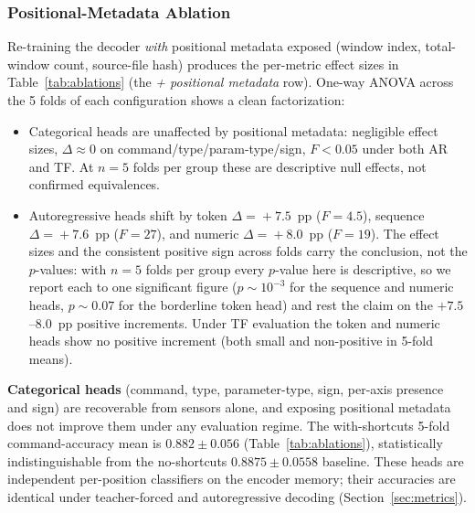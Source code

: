 \documentclass[sensors,article,submit,moreauthors,pdftex]{Definitions/mdpi}
\begin{document}
\subsubsection{Positional-Metadata Ablation}
\label{sec:abl-positional}
Re-training the decoder \emph{with} positional metadata exposed (window index, total-window count, source-file hash) produces the per-metric effect sizes in Table~\ref{tab:ablations} (the \emph{+ positional metadata} row). One-way ANOVA across the 5 folds of each configuration shows a clean factorization:

\begin{itemize}
\item Categorical heads are unaffected by positional metadata: negligible effect sizes, $\Delta\!\approx\!0$ on command/type/param-type/sign, $F<0.05$ under both AR and TF. At $n\!=\!5$ folds per group these are descriptive null effects, not confirmed equivalences.
\item Autoregressive heads shift by token $\Delta\!=\!+7.5$~pp ($F\!=\!4.5$), sequence $\Delta\!=\!+7.6$~pp ($F\!=\!27$), and numeric $\Delta\!=\!+8.0$~pp ($F\!=\!19$). The effect sizes and the consistent positive sign across folds carry the conclusion, not the $p$-values: with $n\!=\!5$ folds per group every $p$-value here is descriptive, so we report each to one significant figure ($p\!\sim\!10^{-3}$ for the sequence and numeric heads, $p\!\sim\!0.07$ for the borderline token head) and rest the claim on the $+7.5$--$8.0$~pp positive increments. Under TF evaluation the token and numeric heads show no positive increment (both small and non-positive in 5-fold means).
\end{itemize}

\textbf{Categorical heads} (command, type, parameter-type, sign, per-axis presence and sign) are recoverable from sensors alone, and exposing positional metadata does not improve them under any evaluation regime. The with-shortcuts 5-fold command-accuracy mean is $0.882 \pm 0.056$ (Table~\ref{tab:ablations}), statistically indistinguishable from the no-shortcuts $0.8875 \pm 0.0558$ baseline. These heads are independent per-position classifiers on the encoder memory; their accuracies are identical under teacher-forced and autoregressive decoding (Section~\ref{sec:metrics}).
\end{document}
